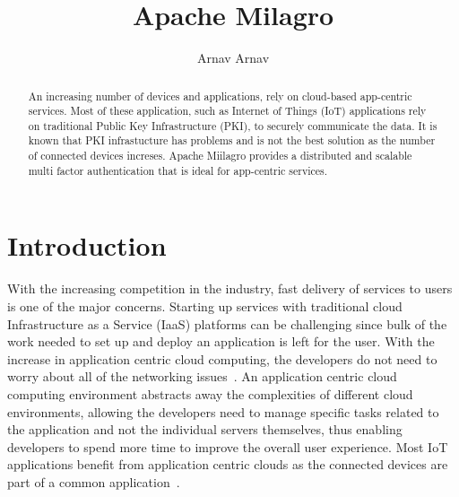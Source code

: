 
\title{Apache Milagro}


\author{Arnav Arnav}

\renewcommand{\shortauthors}{Arnav}


\begin{abstract}
An increasing number of devices and applications, rely on cloud-based
app-centric services. Most of these application, such as Internet of
Things (IoT) applications rely on traditional Public Key
Infrastructure (PKI), to securely communicate the data. It is known
that PKI infrastucture has problems and is not the best solution as
the number of connected devices increses.  Apache Miilagro provides a
distributed and scalable multi factor authentication that is ideal for
app-centric services.
\end{abstract}


\maketitle


\section{Introduction}
With the increasing competition in the industry, fast delivery of
services to users is one of the major concerns. Starting up services
with traditional cloud Infrastructure as a Service (IaaS) platforms
can be challenging since bulk of the work needed to set up and deploy
an application is left for the user. With the increase in application
centric cloud computing, the developers do not need to worry about all
of the networking issues~\cite{bmc-app-centric}. An application
centric cloud computing environment abstracts away the complexities of
different cloud environments, allowing the developers need to manage
specific tasks related to the application and not the individual
servers themselves, thus enabling developers to spend more time to
improve the overall user experience. Most IoT applications benefit
from application centric clouds as the connected devices are part of a
common application~\cite{vb-app-centric}.

